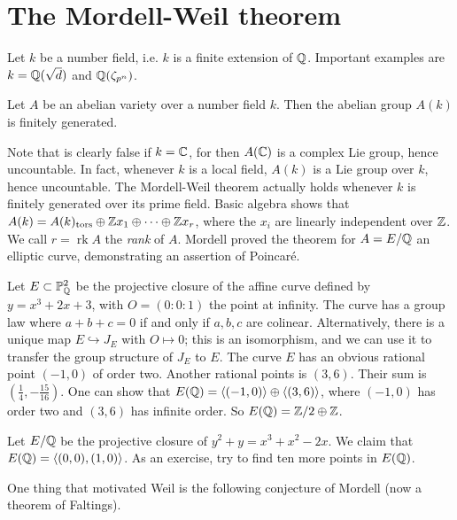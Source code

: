 \documentclass{article}
\begin{document}
\section{The Mordell-Weil theorem}

Let $k$ be a number field, i.e. $k$ is a finite extension of $\mathbb{Q}$. Important 
examples are $k=\mathbb{Q}(\sqrt d)$ and $\mathbb{Q}(\zeta_{p^n})$. 

\begin{theorem}
Let $A$ be an abelian variety over a number field $k$. Then the abelian group 
$A(k)$ is finitely generated.
\end{theorem}

Note that is clearly false if $k=\mathbb{C}$, for then $A(\mathbb{C})$ is a complex Lie 
group, hence uncountable. In fact, whenever $k$ is a local field, $A(k)$ is a 
Lie group over $k$, hence uncountable. The Mordell-Weil theorem actually holds 
whenever $k$ is finitely generated over its prime field. Basic algebra shows 
that $A(k) = A(k)_\text{tors}\oplus \mathbb{Z} x_1\oplus \cdots \oplus \mathbb{Z} x_r$, where 
the $x_i$ are linearly independent over $\mathbb{Z}$. We call $r=\operatorname{rk} A$ 
the \emph{rank} of $A$. Mordell proved the theorem for $A=E/\mathbb{Q}$ an elliptic 
curve, demonstrating an assertion of Poincar\'e.

\begin{example}
Let $E\subset \mathbb{P}_{\mathbb{Q}}^2$ be the projective closure of the affine curve 
defined by $y=x^3+2 x+3$, with $O=(0:0:1)$ the point at infinity. The curve 
has a group law where $a+b+c=0$ if and only if $a,b,c$ are colinear. 
Alternatively, there is a unique map $E\hookrightarrow J_E$ with $O\mapsto 0$; 
this is an isomorphism, and we can use it to transfer the group structure of 
$J_E$ to $E$. The curve $E$ has an obvious rational point $(-1,0)$ of order 
two. Another rational points is $(3,6)$. Their sum is 
$\left(\frac 1 4,-\frac{15}{16}\right)$. One can show that 
$E(\mathbb{Q}) = \langle (-1,0)\rangle \oplus \langle (3,6)\rangle$, where 
$(-1,0)$ has order two and $(3,6)$ has infinite order. So 
$E(\mathbb{Q}) = \mathbb{Z}/2\oplus \mathbb{Z}$. 
\end{example}

\begin{example}
Let $E/\mathbb{Q}$ be the projective closure of $y^2+y = x^3+x^2 - 2 x$. We claim 
that $E(\mathbb{Q}) = \langle (0,0),(1,0)\rangle$. As an exercise, try to find ten 
more points in $E(\mathbb{Q})$. 
\end{example}

One thing that motivated Weil is the following conjecture of Mordell (now a 
theorem of Faltings). 
\end{document}
